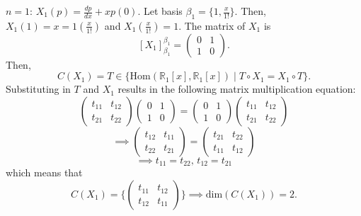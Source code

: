 \documentclass{article}
\begin{document}
\begin{itemize}
	      $\boxed{n=1}$: $X_1(p)=\frac{dp}{dx}+xp(0)$. Let basis $\beta_1=\{1,\frac{x}{1!}\}$. Then, $X_1(1)=x=1(\frac{x}{1!})$ and $X_1(\frac{x}{1!})=1$. The matrix of $X_1$ is \[[X_1]_{\beta_1}^{\beta_1}=\begin{pmatrix}0&1\\1&0\end{pmatrix}.\]Then,\[C(X_1)=T\in\{\text{Hom}(\mathbb{R}_1[x],\mathbb{R}_1[x])\mid T\circ X_1=X_1\circ T\}.\]Substituting in $T$ and $X_1$ results in the following matrix multiplication equation: \[\begin{pmatrix}t_{11}&t_{12}\\t_{21}&t_{22}\end{pmatrix}\begin{pmatrix}0&1\\1&0\end{pmatrix}=\begin{pmatrix}0&1\\1&0\end{pmatrix}\begin{pmatrix}t_{11}&t_{12}\\t_{21}&t_{22}\end{pmatrix}\]\[\implies\begin{pmatrix}t_{12}&t_{11}\\t_{22}&t_{21}\end{pmatrix}=\begin{pmatrix}t_{21}&t_{22}\\t_{11}&t_{12}\end{pmatrix}\]\[\implies t_{11}=t_{22}\text{, }t_{12}=t_{21}\] which means that\[C(X_1)=\{\begin{pmatrix}t_{11}&t_{12}\\t_{12}&t_{11}\end{pmatrix}\}\implies \text{dim}(C(X_1))=2.\]

\end{itemize}
\end{document}

